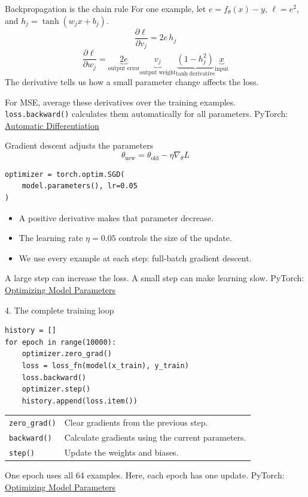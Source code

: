\documentclass[aspectratio=169,11pt]{beamer}
\newcommand{\source}{\vfill{\tiny\color{gray}PyTorch: \href{https://docs.pytorch.org/tutorials/beginner/basics/optimization_tutorial.html}{Optimizing Model Parameters}}}
\begin{document}
\begin{frame}{Backpropagation is the chain rule}
For one example, let $e=f_\theta(x)-y$, $\ell=e^2$, and $h_j=\tanh(w_jx+b_j)$.
\vspace{3mm}
\large
\[\frac{\partial\ell}{\partial v_j}=2e\,h_j\]
\[\frac{\partial\ell}{\partial w_j}
=\underbrace{2e}_{\text{output error}}
\underbrace{v_j}_{\text{output weight}}
\underbrace{(1-h_j^2)}_{\tanh\text{ derivative}}
\underbrace{x}_{\text{input}}\]
\normalsize
\vspace{4mm}
The derivative tells us how a small parameter change affects the loss.
\vspace{3mm}

For MSE, average these derivatives over the training examples.\\
\texttt{loss.backward()} calculates them automatically for all parameters.
\vfill{\tiny\color{gray}PyTorch: \href{https://docs.pytorch.org/tutorials/beginner/basics/autogradqs_tutorial.html}{Automatic Differentiation}}
\end{frame}

\begin{frame}[fragile]{Gradient descent adjusts the parameters}
\large
\[\boxed{\theta_{\mathrm{new}}=\theta_{\mathrm{old}}-\eta\nabla_\theta L}\]
\normalsize
\begin{lstlisting}
optimizer = torch.optim.SGD(
    model.parameters(), lr=0.05
)
\end{lstlisting}
\begin{itemize}\setlength\itemsep{3mm}
\item A positive derivative makes that parameter decrease.
\item The learning rate $\eta=0.05$ controls the size of the update.
\item We use every example at each step: full-batch gradient descent.
\end{itemize}
\vspace{3mm}
A large step can increase the loss. A small step can make learning slow.
\source
\end{frame}

\begin{frame}[fragile]{4. The complete training loop}
\begin{lstlisting}
history = []
for epoch in range(10000):
    optimizer.zero_grad()
    loss = loss_fn(model(x_train), y_train)
    loss.backward()
    optimizer.step()
    history.append(loss.item())
\end{lstlisting}
\vspace{2mm}
\begin{tabular}{ll}
\texttt{zero\_grad()} & Clear gradients from the previous step.\\[1.5mm]
\texttt{backward()} & Calculate gradients using the current parameters.\\[1.5mm]
\texttt{step()} & Update the weights and biases.\\
\end{tabular}
\vspace{3mm}

One epoch uses all 64 examples. Here, each epoch has one update.
\source
\end{frame}
\end{document}

